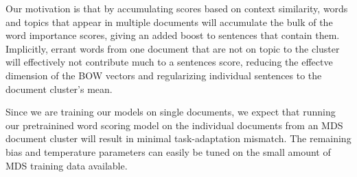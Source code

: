         Our motivation is that by accumulating scores based on context
        similarity, words and topics that appear in multiple documents 
        will accumulate the bulk of the word importance scores, giving 
        an added boost to sentences that contain them. Implicitly, errant
        words from one document that are not on topic to the cluster will
        effectively not contribute much to a sentences score, reducing the 
        effectve dimension of the BOW vectors and regularizing individual
        sentences to the document cluster's mean.

        
        Since we are training our models on single documents, we expect that
        running our pretrainined word scoring model on the individual 
        documents from an MDS document cluster will result in 
        minimal task-adaptation mismatch. The remaining bias and temperature
        parameters can easily be tuned on the small amount of MDS training 
        data available.










 
